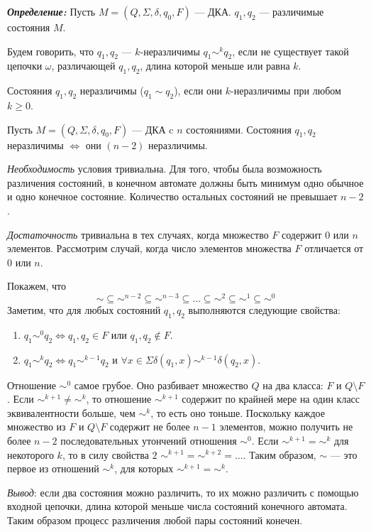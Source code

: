 \textit{\textbf{Определение:}} Пусть $M = (Q,\Sigma, \delta, q_0, F)$ --- ДКА. $q_1, q_2$ --- различимые состояния $M$.

Будем говорить, что $q_1, q_2$ --- $k$-неразличимы $q_1 \sim^k q_2$, если не существует такой цепочки $\omega$, различающей $q_1, q_2$, длина которой меньше или равна $k$.

Состояния $q_1, q_2$ неразличимы ($q_1 \sim q_2$), если они $k$-неразличимы при любом $k \geq 0$.

\begin{mylemma}
Пусть $M = (Q,\Sigma, \delta, q_0, F)$ --- ДКА c $n$ состояниями. Состояния $q_1, q_2$ неразличимы $\Leftrightarrow$ они $(n-2)$ неразличимы.
\end{mylemma}
\begin{myproof}
\textit{Необходимость} условия тривиальна. Для того, чтобы была возможность различения состояний, в конечном автомате должны быть минимум одно обычное и одно конечное состояние. Количество остальных состояний не превышает $n-2$.

\textit{Достаточность} тривиальна в тех случаях, когда множество $F$ содержит $0$ или $n$ элементов. Рассмотрим случай, когда число элементов множества $F$ отличается от $0$ или $n$.

Покажем, что
\[ \sim \subseteq \sim^{n-2} \subseteq \sim^{n-3} \subseteq \ldots \subseteq \sim^{2} \subseteq \sim^{1}  \subseteq \sim^{0} \]
Заметим, что для любых состояний $q_1, q_2$ выполняются следующие свойства:
\begin{enumerate}
\item $q_1 \sim^0 q_2 \Leftrightarrow q_1, q_2 \in F$ или $q_1, q_2 \notin F$.
\item $q_1 \sim^k q_2 \Leftrightarrow q_1 \sim^{k-1} q_2$ и $ \forall x \in \Sigma \delta(q_1, x) \sim^{k-1} \delta(q_2, x)$.
\end{enumerate}
Отношение $\sim^0$ самое грубое. Оно разбивает множество $Q$ на два класса: $F$ и $Q \setminus F$. Если $\sim^{k+1} \neq \sim^k$, то отношение $\sim^{k+1}$ содержит по крайней мере на один класс эквивалентности больше, чем $\sim^k$, то есть оно тоньше. Поскольку каждое множество из $F$ и $Q \setminus F$ содержит не более $n-1$ элементов, можно получить не более $n-2$ последовательных утончений отношения $\sim^0$. Если $\sim^{k+1} = \sim^{k}$ для некоторого $k$, то в силу свойства $2$ $\sim^{k+1} = \sim^{k+2} = \ldots$. Таким образом, $\sim$ --- это первое из отношений $\sim^{k}$, для которых $\sim^{k+1} = \sim^{k}$.
\end{myproof}
\textit{Вывод}: если два состояния можно различить, то их можно различить с помощью входной цепочки, длина которой меньше числа состояний конечного автомата. Таким образом процесс различения любой пары состояний конечен.

